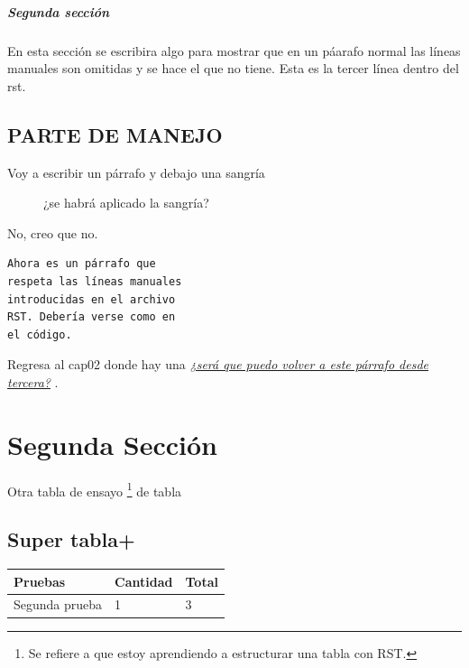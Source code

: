 \documentclass[letterpaper,10pt,spanish]{sphinxmanual}
\begin{document}
\subsubsection{Segunda sección}
\label{cap01:segunda}\label{cap01:segunda-seccion}
En esta sección se escribira algo
para mostrar que en un páarafo normal las líneas manuales son omitidas y se hace el que no tiene.
Esta es la tercer línea dentro del rst.


\chapter{PARTE DE MANEJO}
\label{cap01:tercera}\label{cap01:parte-de-manejo}\begin{description}
\item[{Voy a escribir un párrafo y debajo una sangría}] \leavevmode
¿se habrá aplicado la sangría?

\end{description}

No, creo que no.

\begin{Verbatim}[commandchars=\\\{\}]
Ahora es un párrafo que
respeta las líneas manuales
introducidas en el archivo
RST. Debería verse como en
el código.
\end{Verbatim}

Regresa al cap02 donde hay una {\hyperref[cap02:pregunta]{\emph{¿será que puedo volver a este párrafo desde tercera?}}} .


\part{Segunda Sección}
\label{cap02:segunda-seccion}\label{cap02::doc}
Otra tabla de ensayo \footnote[1]{
Se refiere a que estoy aprendiendo a estructurar una tabla con RST.
} de tabla


\chapter{\textbf{Super tabla+}}
\label{cap02:sueldo}\label{cap02:super-tabla}
\begin{tabulary}{\linewidth}{|L|L|L|}
\hline
\textsf{\relax 
Pruebas
} & \textsf{\relax 
Cantidad \protect\footnotemark[2]
} & \textsf{\relax 
Total
}\\
\hline
Segunda prueba
 & 
1
 & 
3
\\
\hline\end{tabulary}
\end{document}
